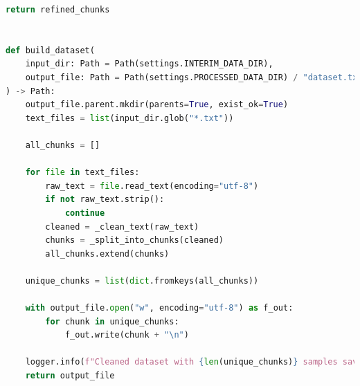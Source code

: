 \begin{itemize}
\begin{lstlisting}[language=Python, numbers=none, frame=none]
    return refined_chunks


def build_dataset(
    input_dir: Path = Path(settings.INTERIM_DATA_DIR),
    output_file: Path = Path(settings.PROCESSED_DATA_DIR) / "dataset.txt",
) -> Path:
    output_file.parent.mkdir(parents=True, exist_ok=True)
    text_files = list(input_dir.glob("*.txt"))

    all_chunks = []

    for file in text_files:
        raw_text = file.read_text(encoding="utf-8")
        if not raw_text.strip():
            continue
        cleaned = _clean_text(raw_text)
        chunks = _split_into_chunks(cleaned)
        all_chunks.extend(chunks)

    unique_chunks = list(dict.fromkeys(all_chunks))

    with output_file.open("w", encoding="utf-8") as f_out:
        for chunk in unique_chunks:
            f_out.write(chunk + "\n")

    logger.info(f"Cleaned dataset with {len(unique_chunks)} samples saved at {output_file}")
    return output_file
\end{lstlisting}
\end{itemize}

